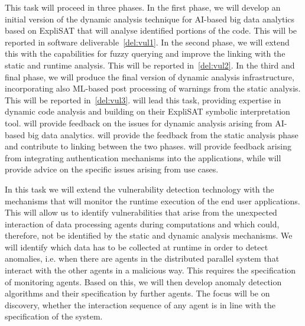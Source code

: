 \begin{Workpackage}{\thewpno}
\begin{Task}
This task will proceed in three phases. In the first phase, we will develop an initial version of the dynamic analysis technique for AI-based big data analytics based on ExpliSAT that will analyse identified portions of the code. This will be reported in software deliverable~\ref{del:vul1}. In the second phase, we will extend this with the capabilities for fuzzy querying and improve the linking with the static and runtime analysis. This will be reported in~\ref{del:vul2}. In the third and final phase, we will produce the final version of dynamic analysis infrastructure, incorporating also ML-based post processing of warnings from the static analysis. This will be reported in~\ref{del:vul3}. \IBMshort{} will lead this task, providing expertise in dynamic code analysis and building on their ExpliSAT symbolic interpretation tool. \UODshort{} will provide feedback on the issues for dynamic analysis arising from AI-based big data analytics. \YAGshort{} will provide the feedback from the static analysis phase and contribute to linking between the two phases. \COGNIshort{} will provide feedback arising from integrating authentication mechanisms into the applications, while \SOPRAshort{} will provide advice on the specific issues arising from use cases.
\end{Task}

\begin{Task}
\TaskResults{%
\ref{del:vul1},
\ref{del:vul2},
\ref{del:vul3}
}
\TaskHeader{}
In this task we will extend the vulnerability detection technology with the mechanisms that will monitor the runtime execution of the end user applications. This will allow us to identify vulnerabilities that arise from the unexpected interaction of data processing agents during computations and which could, therefore, not be identified by the static and dynamic analysis mechanisms. We will identify which data has to be collected at runtime in order to detect anomalies, i.e. when there are agents in the distributed parallel system that interact with the other agents in a malicious way. This requires the specification of monitoring agents. Based on this, we will then develop anomaly detection algorithms and their specification by further agents. The focus will be on discovery, whether the interaction sequence of any agent is in line with the specification of the system.\taskbreak 


\end{Task}
\end{Workpackage}
